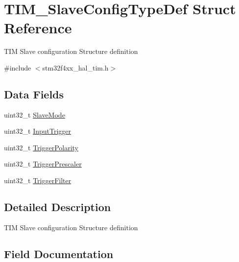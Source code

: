 \hypertarget{struct_t_i_m___slave_config_type_def}{}\section{T\+I\+M\+\_\+\+Slave\+Config\+Type\+Def Struct Reference}
\label{struct_t_i_m___slave_config_type_def}


T\+IM Slave configuration Structure definition ~\newline
  




{\ttfamily \#include $<$stm32f4xx\+\_\+hal\+\_\+tim.\+h$>$}

\subsection*{Data Fields}
\begin{DoxyCompactItemize}
\item 
uint32\+\_\+t \mbox{\hyperlink{struct_t_i_m___slave_config_type_def_aa2b0001c7fceb00968ca503040874b4a}{Slave\+Mode}}
\item 
uint32\+\_\+t \mbox{\hyperlink{struct_t_i_m___slave_config_type_def_a11eb45de70bcf3e3111a2d39bfc77074}{Input\+Trigger}}
\item 
uint32\+\_\+t \mbox{\hyperlink{struct_t_i_m___slave_config_type_def_afd12184c6e590581c775504a2e6c048c}{Trigger\+Polarity}}
\item 
uint32\+\_\+t \mbox{\hyperlink{struct_t_i_m___slave_config_type_def_aa2906798e3808ed40ac203a741512b55}{Trigger\+Prescaler}}
\item 
uint32\+\_\+t \mbox{\hyperlink{struct_t_i_m___slave_config_type_def_aef9e224ccafea4bfdd64193ea84feaf3}{Trigger\+Filter}}
\end{DoxyCompactItemize}


\subsection{Detailed Description}
T\+IM Slave configuration Structure definition ~\newline
 

\subsection{Field Documentation}
\mbox{\label{struct_t_i_m___slave_config_type_def_a11eb45de70bcf3e3111a2d39bfc77074}} 
